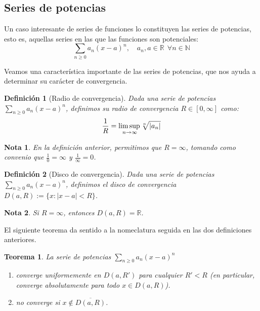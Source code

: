 \documentclass[11pt, a4paper]{article}
\newif\IfInSansMode
\theoremstyle{theorem-style}
\newtheorem{nth}{Teorema}[section]
\theoremstyle{definition-style}
\newtheorem{ndef}{Definición}[section]
\theoremstyle{remark-style}
\newtheorem*{nota}{Nota}
\theoremstyle{example-style}
\newenvironment{nlist}
{\begin{enumerate}
    \renewcommand\labelenumi{(\emph{\roman{enumi})}}}
  {\end{enumerate}}
\begin{document}
\subsection{Series de potencias}

Un caso interesante de series de funciones lo constituyen las series de potencias, esto es, aquellas series en las que las funciones son potenciales: $$\sum_{n \ge 0} a_n(x-a)^n, \quad a_n, a \in \mathbb{R} \ \ \forall n \in \mathbb{N}$$

Veamos una característica importante de las series de potencias, que nos ayuda a determinar su carácter de convergencia.

\begin{ndef}[Radio de convergencia] Dada una serie de potencias $\sum_{n \ge 0} a_n(x-a)^n$, definimos su radio de convergencia $R \in [0, \infty]$ como: $$
  \frac{1}{R} =\underset{n\to\infty}{\mbox{lim\,sup\,}}  \sqrt[n]{|a_n|}$$
\end{ndef}

\begin{nota}
  En la definición anterior, permitimos que $R = \infty$, tomando como convenio que $\frac{1}{0} = \infty$ y $\frac{1}{\infty} = 0$.
\end{nota}

\begin{ndef}[Disco de convergencia] Dada una serie de potencias $\sum_{n \ge 0} a_n(x-a)^n$, definimos el disco de convergencia $D(a,R) := \{ x : |x-a| < R\}$. 
\end{ndef}

\begin{nota}
  Si $R = \infty$, entonces $D(a,R) = \mathbb{R}$.
\end{nota}

El siguiente teorema da sentido a la nomeclatura seguida en las dos definiciones anteriores.

\begin{nth} \label{13}
  La serie de potencias $\displaystyle\sum_{n\geq 0} a_n (x-a)^n$  
  \begin{nlist}
  \item converge uniformemente en $D(a,R')$ para cualquier $R'<R$ (en particular, converge absolutamente para todo $x\in D(a,R)$).
  \item no converge si $x\not\in \overline{D(a,R)}$.
  \end{nlist}
\end{nth}
\end{document}

